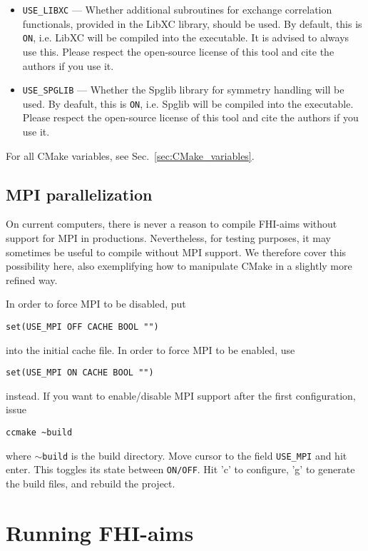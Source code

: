 \begin{itemize}
\item \texttt{USE\_LIBXC} --- Whether additional subroutines for exchange correlation functionals, provided in the LibXC library, should be used. By default, this is \texttt{ON}, i.e. LibXC will be compiled into the executable.  It is advised to always use this. Please respect the open-source license of this tool and cite the authors if you use it.
\item \texttt{USE\_SPGLIB} ---  Whether the Spglib library for symmetry handling will be used.  By deafult, this is \texttt{ON}, i.e. Spglib will be compiled into the executable.  Please respect the open-source license of this tool and cite the authors if you use it.
\end{itemize}

For all CMake variables, see Sec.~\ref{sec:CMake_variables}.

\subsection{MPI parallelization}

On current computers, there is never a reason to compile FHI-aims
without support for MPI in productions. Nevertheless, for testing
purposes, it may sometimes be useful to compile without MPI
support. We therefore cover this possibility here, also exemplifying
how to manipulate CMake in a slightly more refined way.

In order to force MPI to be disabled, put
\begin{verbatim}
set(USE_MPI OFF CACHE BOOL "")
\end{verbatim}
into the initial cache file. In order to force MPI to be enabled, use
\begin{verbatim}
set(USE_MPI ON CACHE BOOL "")
\end{verbatim}
instead. If you want to enable/disable MPI support after the first configuration, issue
\begin{verbatim}
ccmake ~build
\end{verbatim}
where $\sim$\texttt{build} is the build directory. Move cursor to the field \verb+USE_MPI+ and hit enter. This toggles its state between \texttt{ON/OFF}. Hit 'c' to configure, 'g' to generate the build files, and rebuild the project.

\section{Running FHI-aims}
\label{Sec:running}


